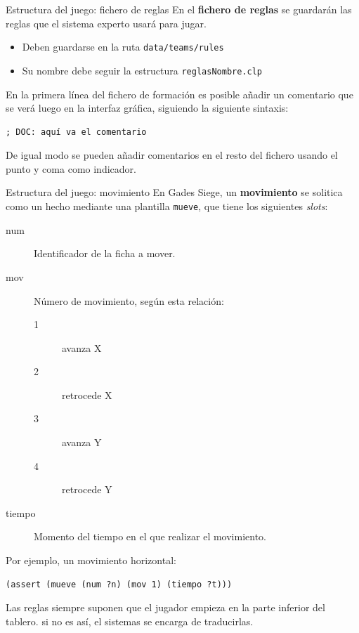 \documentclass[smaller,spanish,xcolor=svgnames]{beamer}
\begin{document}
\begin{frame}[fragile]{Estructura del juego: fichero de reglas}
  En el \textbf{fichero de reglas} se guardarán las reglas que el sistema
  experto usará para jugar.

  \begin{itemize}
  \item Deben guardarse en la ruta \texttt{data/teams/rules}
  \item Su nombre debe seguir la estructura \texttt{reglasNombre.clp}
  \end{itemize}

  \medskip

  En la primera línea del fichero de formación es posible añadir un comentario
  que se verá luego en la interfaz gráfica, siguiendo la siguiente sintaxis:

\begin{verbatim}
; DOC: aquí va el comentario
\end{verbatim}

\medskip

De igual modo se pueden añadir comentarios en el resto del fichero usando el
punto y coma como indicador.
\end{frame}


\begin{frame}[fragile]{Estructura del juego: movimiento}
  En Gades Siege, un \textbf{movimiento} se solitica como un hecho mediante
  una plantilla \texttt{mueve}, que tiene los siguientes \textit{slots}:

  \begin{description}
  \item[num] Identificador de la ficha a mover.
  \item[mov] Número de movimiento, según esta relación:
    {\small
    \begin{description}
    \item[1] avanza X
    \item[2] retrocede X
    \item[3] avanza Y
    \item[4] retrocede Y
    \end{description}}
  \item[tiempo] Momento del tiempo en el que realizar el movimiento.
  \end{description}

Por ejemplo, un movimiento horizontal:
\begin{verbatim}
(assert (mueve (num ?n) (mov 1) (tiempo ?t)))
\end{verbatim}

Las reglas siempre suponen que el jugador empieza en la parte inferior del tablero. si no es así, el sistemas se encarga de traducirlas.
\end{frame}
\end{document}
